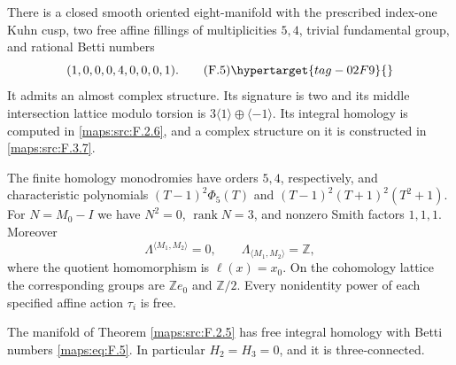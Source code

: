 \begin{theorem}\hypertarget{tag-02NW}{}\label{maps:src:F.2.5}


There is a closed smooth oriented eight-manifold with the prescribed
index-one Kuhn cusp, two free affine fillings of multiplicities $5,4$,
trivial fundamental group, and rational Betti numbers
\[
 (1,0,0,0,4,0,0,0,1). \tag{F.5}\hypertarget{tag-02F9}{}\label{maps:eq:F.5}
\]
It admits an almost complex structure.  Its signature is two and
its middle intersection lattice modulo torsion is
$3\langle1\rangle\oplus\langle-1\rangle$.
Its integral homology is computed in \cref{maps:src:F.2.6}, and a complex structure on it is constructed in \cref{maps:src:F.3.7}.

\end{theorem}

\begin{theorem}\hypertarget{tag-02QI}{}\label{night:P1.1}
The finite homology monodromies have orders $5,4$, respectively, and
characteristic polynomials
$(T-1)^2\Phi _5(T)$ and $(T-1)^2(T+1)^2(T^2+1)$.
For $N=M_0-I$ we have $N^2=0$, $\operatorname{rank}N=3$, and
nonzero Smith factors $1,1,1$.  Moreover
\[
 \Lambda^{\langle M_1,M_2\rangle}=0,\qquad
 \Lambda_{\langle M_1,M_2\rangle}=\mathbb Z,
\]
where the quotient homomorphism is $\ell(x)=x_0$.
On the cohomology lattice the corresponding groups are $\mathbb Ze_0$
and $\mathbb Z/2$.  Every nonidentity power of each specified affine
action $\tau_i$ is free.
\end{theorem}

\begin{theorem}\hypertarget{tag-02NX}{}\label{maps:src:F.2.6}


The manifold of Theorem \ref{maps:src:F.2.5} has free integral homology with
Betti numbers \eqref{maps:eq:F.5}.  In particular $H_2=H_3=0$, and it is
three-connected.

\end{theorem}

